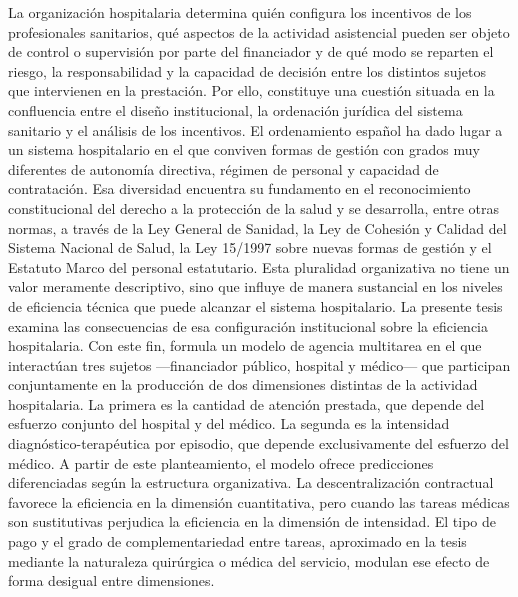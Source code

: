 La organización hospitalaria determina quién configura los incentivos de los profesionales sanitarios, qué aspectos de la actividad asistencial pueden ser objeto de control o supervisión por parte del financiador y de qué modo se reparten el riesgo, la responsabilidad y la capacidad de decisión entre los distintos sujetos que intervienen en la prestación. Por ello, constituye una cuestión situada en la confluencia entre el diseño institucional, la ordenación jurídica del sistema sanitario y el análisis de los incentivos. El ordenamiento español ha dado lugar a un sistema hospitalario en el que conviven formas de gestión con grados muy diferentes de autonomía directiva, régimen de personal y capacidad de contratación. Esa diversidad encuentra su fundamento en el reconocimiento constitucional del derecho a la protección de la salud y se desarrolla, entre otras normas, a través de la Ley General de Sanidad, la Ley de Cohesión y Calidad del Sistema Nacional de Salud, la Ley 15/1997 sobre nuevas formas de gestión y el Estatuto Marco del personal estatutario. Esta pluralidad organizativa no tiene un valor meramente descriptivo, sino que influye de manera sustancial en los niveles de eficiencia técnica que puede alcanzar el sistema hospitalario.
La presente tesis examina las consecuencias de esa configuración institucional sobre la eficiencia hospitalaria. Con este fin, formula un modelo de agencia multitarea en el que interactúan tres sujetos —financiador público, hospital y médico— que participan conjuntamente en la producción de dos dimensiones distintas de la actividad hospitalaria. La primera es la cantidad de atención prestada, que depende del esfuerzo conjunto del hospital y del médico. La segunda es la intensidad diagnóstico-terapéutica por episodio, que depende exclusivamente del esfuerzo del médico. A partir de este planteamiento, el modelo ofrece predicciones diferenciadas según la estructura organizativa. La descentralización contractual favorece la eficiencia en la dimensión cuantitativa, pero cuando las tareas médicas son sustitutivas perjudica la eficiencia en la dimensión de intensidad. El tipo de pago y el grado de complementariedad entre tareas, aproximado en la tesis mediante la naturaleza quirúrgica o médica del servicio, modulan ese efecto de forma desigual entre dimensiones.
